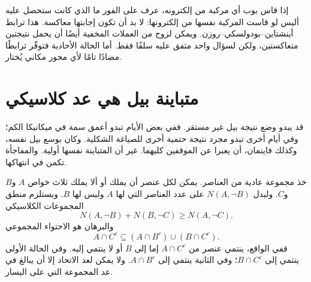 \begin{classroomqa}
\end{classroomqa}

إذا قاس بوب أي مركبة من إلكترونه، عرف على الفور ما الذي كانت ستحصل عليه أليس لو قاست المركبة نفسها من إلكترونها: لا بد أن تكون إجابتها معاكسة. هذا ترابط أينشتاين--بودولسكي--روزن. ويمكن لزوج من العملات المخفية أيضًا أن يحمل نتيجتين متعاكستين، ولكن لسؤال واحد متفق عليه سلفًا فقط. أما الحالة الأحادية فتوفّر ترابطًا مضادًا تامًا لأي محور مكاني يُختار.

\begin{classroomqa}
\end{classroomqa}

\begin{classroomqa}
\end{classroomqa}

\section{متباينة بيل هي عد كلاسيكي}

قد يبدو وضع نتيجة بيل غير مستقر. ففي بعض الأيام تبدو أعمق سمة في ميكانيكا الكم؛ وفي أيام أخرى تبدو مجرد نتيجة حتمية أخرى للصياغة الشكلية. وكان بوسع بيل نفسه، وكذلك فاينمان، أن يعبرا عن الموقفين كليهما. غير أن المتباينة نفسها أولية. والمفاجأة تكمن في انتهاكها.

خذ مجموعة عادية من العناصر. يمكن لكل عنصر أن يملك أو ألا يملك ثلاث خواص \(A\) و\(B\) و\(C\). وليدل \(N(A,\neg B)\) على عدد العناصر التي لها \(A\) وليس لها \(B\). ويستلزم منطق المجموعات الكلاسيكي
\begin{equation}
  N(A,\neg B)+N(B,\neg C)
  \geq
  N(A,\neg C).
  \label{eq:l05-bell-count}
\end{equation}
والبرهان هو الاحتواء المجموعي
\begin{equation}
  A\cap C^{c}
  \subseteq
  (A\cap B^{c})\cup(B\cap C^{c}).
  \label{eq:l05-set-inclusion}
\end{equation}
ففي الواقع، ينتمي عنصر من \(A\cap C^c\) إما إلى \(B\) أو لا ينتمي إليه. وفي الحالة الأولى ينتمي إلى \(B\cap C^c\)؛ وفي الثانية ينتمي إلى \(A\cap B^c\). ولا يمكن لعد الاتحاد إلا أن يبالغ في عد المجموعة التي على اليسار.

